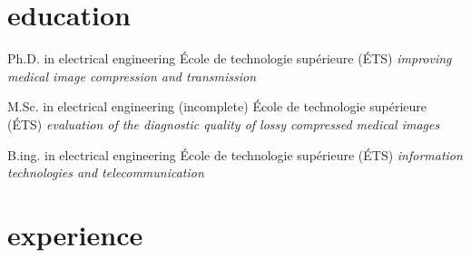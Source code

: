 \documentclass[print]{friggeri-cv}
\begin{document}


\section{education}
\begin{entrylist}
   {Ph.D. in electrical engineering} {École de technologie supérieure {\scriptsize (ÉTS)}} {\emph{improving medical image compression and transmission}}

   {M.Sc. in electrical engineering (incomplete\textsuperscript{\tiny\textdaggerdbl})} {École de technologie supérieure {\scriptsize (ÉTS)}} {\emph{evaluation of the diagnostic quality of lossy compressed medical images}}
  
   {B.ing. in electrical engineering} {École de technologie supérieure {\scriptsize (ÉTS)}} {\emph{information technologies and telecommunication}}

\end{entrylist}



\section{experience}
\end{document}

